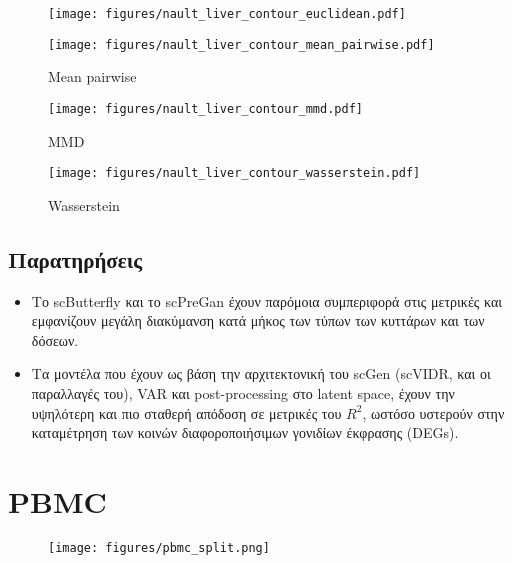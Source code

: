 \begin{figure}[h!]
    \centering
    \texttt{[image: figures/nault\_liver\_contour\_euclidean.pdf]}
\end{figure}

\clearpage

\begin{figure}[h!]
    \centering
    \texttt{[image: figures/nault\_liver\_contour\_mean\_pairwise.pdf]}
    \caption{Mean pairwise}
\end{figure}

\begin{figure}[h!]
    \centering
    \texttt{[image: figures/nault\_liver\_contour\_mmd.pdf]}
    \caption{MMD}
\end{figure}

\clearpage

\begin{figure}[h!]
    \centering
    \texttt{[image: figures/nault\_liver\_contour\_wasserstein.pdf]}
    \caption{Wasserstein}
\end{figure}

\clearpage

\subsection{Παρατηρήσεις}

\begin{itemize}
    \itemsep -0.2em
    \item Το scButterfly και το scPreGan έχουν παρόμοια συμπεριφορά στις μετρικές και εμφανίζουν μεγάλη διακύμανση κατά μήκος των τύπων των κυττάρων και των δόσεων.
    \item Τα μοντέλα που έχουν ως βάση την αρχιτεκτονική του scGen (scVIDR, και οι παραλλαγές του), VAR και post-processing στο latent space, έχουν την υψηλότερη και πιο σταθερή απόδοση σε μετρικές του $R^2$, ωστόσο υστερούν στην καταμέτρηση των κοινών διαφοροποιήσιμων γονιδίων έκφρασης (DEGs).
\end{itemize}

\clearpage

\section{PBMC}


\begin{figure}[h!]
    \centering
    \texttt{[image: figures/pbmc\_split.png]}
\end{figure}

